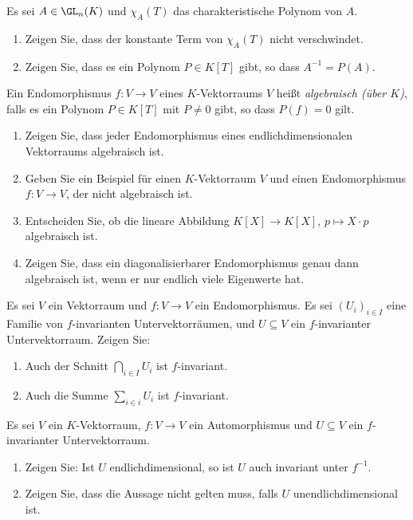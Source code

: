 \begin{question}
  Es sei $A \in \GL_n(K)$ und $\chi_A(T)$ das charakteristische Polynom von $A$.
  \begin{enumerate}[leftmargin=*]
    \item
      Zeigen Sie, dass der konstante Term von $\chi_A(T)$ nicht verschwindet.
    \item
      Zeigen Sie, dass es ein Polynom $P \in K[T]$ gibt, so dass $A^{-1} = P(A)$.
  \end{enumerate}
\end{question}


\begin{question}
  Ein Endomorphismus $f \colon V \to V$ eines $K$-Vektorraums $V$ heißt \emph{algebraisch (über $K$)}, falls es ein Polynom $P \in K[T]$ mit $P \neq 0$ gibt, so dass $P(f) = 0$ gilt.
  \begin{enumerate}[leftmargin=*]
    \item
      Zeigen Sie, dass jeder Endomorphismus eines endlichdimensionalen Vektorraums algebraisch ist.
    \item
      Geben Sie ein Beispiel für einen $K$-Vektorraum $V$ und einen Endomorphismus $f \colon V \to V$, der nicht algebraisch ist.
    \item
      Entscheiden Sie, ob die lineare Abbildung $K[X] \to K[X]$, $p \mapsto X \cdot p$ algebraisch ist.
    \item
      Zeigen Sie, dass ein diagonalisierbarer Endomorphismus genau dann algebraisch ist, wenn er nur endlich viele Eigenwerte hat.
  \end{enumerate}
\end{question}


\begin{question}
  Es sei $V$ ein Vektorraum und $f \colon V \to V$ ein Endomorphismus.
  Es sei $(U_i)_{i \in I}$ eine Familie von $f$-invarianten Untervektorräumen, und $U \subseteq V$ ein $f$-invarianter Untervektorraum.
  Zeigen Sie:
  \begin{enumerate}[leftmargin=*]
    \item
      Auch der Schnitt $\bigcap_{i \in I} U_i$ ist $f$-invariant.
    \item
      Auch die Summe $\sum_{i \in i} U_i$ ist $f$-invariant.
  \end{enumerate}
\end{question}


\begin{question}
  Es sei $V$ ein $K$-Vektorraum, $f \colon V \to V$ ein Automorphismus und $U \subseteq V$ ein $f$-invarianter Untervektorraum.
  \begin{enumerate}[leftmargin=*]
    \item
      Zeigen Sie:
      Ist $U$ endlichdimensional, so ist $U$ auch invariant unter $f^{-1}$.
    \item
      Zeigen Sie, dass die Aussage nicht gelten muss, falls $U$ unendlichdimensional ist.
  \end{enumerate}
\end{question}










